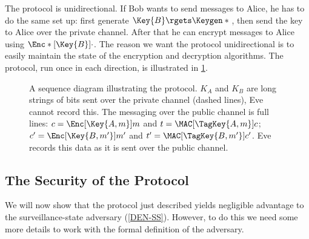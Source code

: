 The protocol is unidirectional.
If Bob wants to send messages to Alice, he has to do the same set up:
first generate \(\Key{B}\rgets \Keygen*{}\), then send the key to Alice over 
the private channel.
After that he can encrypt messages to Alice using \(\Enc*[\Key{B}]{\cdot}\).
The reason we want the protocol unidirectional is to easily maintain the state 
of the encryption and decryption algorithms.
The protocol, run once in each direction, is illustrated in 
\cref{ProtocolOverview}.

\begin{figure}
  \centering
  \begin{msc}[msc keyword=]{}


    \nextlevel{}

    \nextlevel{}

    \nextlevel[1.6]


  \end{msc}
  \caption{%
    A sequence diagram illustrating the protocol.
    \(K_A\) and \(K_B\) are long strings of bits sent over the private channel 
    (dashed lines), Eve cannot record this.
    The messaging over the public channel is full lines:
    \(c = \Enc[\Key{A,m}]{ m }\) and \(t = \MAC[\TagKey{A,m}]{ c }\);
    \(c^\prime = \Enc[\Key{B,m^\prime}]{ m^\prime }\) and \(t^\prime 
      = \MAC[\TagKey{B,m^\prime}]{ c^\prime }\).
    Eve records this data as it is sent over the public channel.
  }\label{ProtocolOverview}
\end{figure}

\subsection{The Security of the Protocol}

We will now show that the protocol just described yields negligible advantage 
to the surveillance-state adversary (\cref{DEN-SS}).
However, to do this we need some more details to work with the formal 
definition of the adversary.

